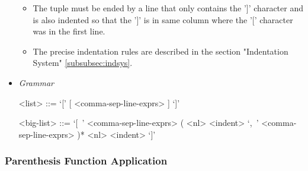 \documentclass{article}
\begin{document}
\begin{itemize}
\begin{itemize}
  \item
  The tuple must be ended by a line that only contains the ']' character and is 
  also indented so that the ']' is in same column where the '[' character was in
  the first line.

  \item
  The precise indentation rules are described in the section
  "Indentation System" \ref{subsubsec:indsys}.
  \end{itemize}

\item \textit{Grammar}
\begin{grammar}
<list> ::= `[' [ <comma-sep-line-exprs> ] `]'

<big-list> ::= 
`[\ ' <comma-sep-line-exprs>
( <nl> <indent> `,\ ' <comma-sep-line-exprs> )*
<nl> <indent> `]'
\end{grammar}

\end{itemize}

\subsubsection{Parenthesis Function Application}
\label{subsec:parenfuncapp}
\end{document}
